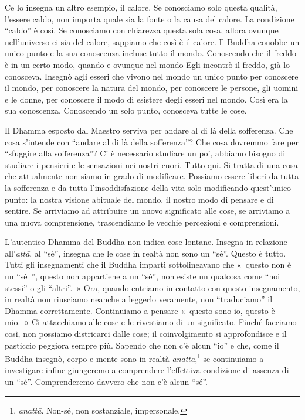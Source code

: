 Ce lo insegna un altro esempio, il calore. Se conosciamo solo questa
qualità, l'essere caldo, non importa quale sia la fonte o la causa del
calore. La condizione ``caldo'' è così. Se conosciamo con chiarezza
questa sola cosa, allora ovunque nell'universo ci sia del calore,
sappiamo che così è il calore. Il Buddha conobbe un unico punto e la sua
conoscenza incluse tutto il mondo. Conoscendo che il freddo è in un
certo modo, quando e ovunque nel mondo Egli incontrò il freddo, già lo
conosceva. Insegnò agli esseri che vivono nel mondo un unico punto per
conoscere il mondo, per conoscere la natura del mondo, per conoscere le
persone, gli uomini e le donne, per conoscere il modo di esistere degli
esseri nel mondo. Così era la sua conoscenza. Conoscendo un solo punto,
conosceva tutte le cose.

Il Dhamma esposto dal Maestro serviva per andare al di là della
sofferenza. Che cosa s'intende con ``andare al di là della sofferenza''?
Che cosa dovremmo fare per ``sfuggire alla sofferenza''? Ci è necessario
studiare un po', abbiamo bisogno di studiare i pensieri e le sensazioni
nei nostri cuori. Tutto qui. Si tratta di una cosa che attualmente non
siamo in grado di modificare. Possiamo essere liberi da tutta la
sofferenza e da tutta l'insoddisfazione della vita solo modificando
quest'unico punto: la nostra visione abituale del mondo, il nostro modo
di pensare e di sentire. Se arriviamo ad attribuire un nuovo significato
alle cose, se arriviamo a una nuova comprensione, trascendiamo le
vecchie percezioni e comprensioni.

L'autentico Dhamma del Buddha non indica cose lontane. Insegna in
relazione all'\emph{attā}, al ``sé'', insegna che le cose in realtà non
sono un ``sé''. Questo è tutto. Tutti gli insegnamenti che il Buddha
impartì sottolineavano che «~questo non è un ``sé~'', questo non
appartiene a un ``sé'', non esiste un qualcosa come ``noi stessi'' o gli
``altri''.~» Ora, quando entriamo in contatto con questo insegnamento,
in realtà non riusciamo neanche a leggerlo veramente, non ``traduciamo''
il Dhamma correttamente. Continuiamo a pensare «~questo sono io, questo
è mio.~» Ci attacchiamo alle cose e le rivestiamo di un significato.
Finché facciamo così, non possiamo districarci dalle cose; il
coinvolgimento si approfondisce e il pasticcio peggiora sempre più.
Sapendo che non c'è alcun ``io'' e che, come il Buddha insegnò, corpo e
mente sono in realtà \emph{anattā},\footnote{\emph{anattā}. Non-sé, non
  sostanziale, impersonale.} se continuiamo a investigare infine
giungeremo a comprendere l'effettiva condizione di assenza di un ``sé''.
Comprenderemo davvero che non c'è alcun ``sé''.


